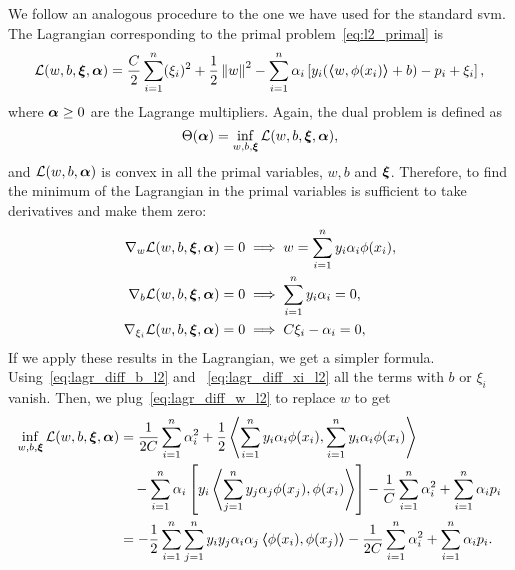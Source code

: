 %
We follow an analogous procedure to the one we have used for the standard \acrshort{svm}. The Lagrangian corresponding to the primal problem~\eqref{eq:l2_primal} is 
\begin{equation}
    \label{eq:l2_lagr}
    \lagr(w, b, \fv{\xi}, \fv{\alpha}) = \frac{C}{2} \sum_{i=1}^\nsamples (\xi_i)^2 + \frac{1}{2} \norm{w}^2 - \sum_{i=1}^\nsamples \alpha_i \left[ y_i (\dotp{w}{\phi(x_i)} + b) - p_i + \xi_i \right] ,
\end{equation}
%
where $\bm{\alpha} \geq 0$ are the Lagrange multipliers.
%
Again, the dual problem is defined as 
$$ \Theta(\bm{\alpha}) = \inf_{w, b, \bm{\xi}} \mathcal{L}(w, b, \bm{\xi}, \bm{\alpha}) , $$
and $\mathcal{L}(w, b, \bm{\alpha})$ is convex in all the primal variables, $w, b$ and $\bm{\xi}$. Therefore, to find the minimum of the Lagrangian in the primal variables is sufficient to take derivatives and make them zero:
\begin{align}
    \nabla_w \lagr(w, b, \fv{\xi}, \fv{\alpha}) = 0 &\implies w = \sum_{i=1}^\nsamples y_i \alpha_i \phi(x_i) , \label{eq:lagr_diff_w_l2} \\
    \nabla_b \lagr(w, b, \fv{\xi}, \fv{\alpha}) = 0 &\implies \sum_{i=1}^\nsamples y_i \alpha_i = 0, \label{eq:lagr_diff_b_l2} \\
    \nabla_{\xi_i} \lagr(w, b, \fv{\xi}, \fv{\alpha}) = 0 &\implies C \xi_i - \alpha_i  = 0 , \label{eq:lagr_diff_xi_l2}
\end{align}
If we apply these results in the Lagrangian, we get a simpler formula. Using~\eqref{eq:lagr_diff_b_l2} and ~\eqref{eq:lagr_diff_xi_l2} all the terms with $b$ or $\xi_i$ vanish. Then, we plug~\eqref{eq:lagr_diff_w_l2} to replace $w$ to get 
\begin{equation}
    \nonumber
    \begin{aligned}
        \inf_{w, b, \bm{\xi}} \mathcal{L}(w, b, \bm{\xi}, \bm{\alpha}) &= \frac{1}{2C} \sum_{i=1}^n \alpha_i^2 + \frac{1}{2} \bm{\left\langle} \sum_{i=1}^n y_i \alpha_i \phi(x_i), \sum_{i=1}^n y_i \alpha_i \phi(x_i) \bm{\right\rangle} \\
        &\quad- \sum_{i=1}^n \alpha_i \left[y_i \bm{\left\langle} \sum_{j=1}^n y_j \alpha_j \phi(x_j), \phi(x_i) \bm{\right\rangle}  \right] - \frac{1}{C} \sum_{i=1}^n \alpha_i^2 + \sum_{i=1}^n \alpha_i p_i  \\
        &= -\frac{1}{2} \sum_{i=1}^n \sum_{j=1}^n y_i y_j \alpha_i \alpha_j \bm{\left\langle} \phi(x_i), \phi(x_j) \bm{\right\rangle} - \frac{1}{2C} \sum_{i=1}^n \alpha_i^2 + \sum_{i=1}^n \alpha_i p_i .
    \end{aligned}
\end{equation}

